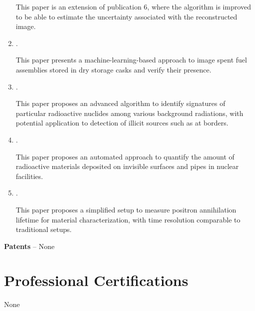 \documentclass[letterpaper,11pt]{article} %
\begin{document}
\begin{enumerate}
    This paper is an extension of publication 6, where the algorithm is improved to be able to estimate the uncertainty associated with the reconstructed image.
    \item {}. 
    
    This paper presents a machine-learning-based approach to image spent fuel assemblies stored in dry storage casks and verify their presence.
    \item {}. 
    
    This paper proposes an advanced algorithm to identify signatures of particular radioactive nuclides among various background radiations, with potential application to detection of illicit sources such as at borders.
    \item {}. 
    
    This paper proposes an automated approach to quantify the amount of radioactive materials deposited on invisible surfaces and pipes in nuclear facilities. 
    \item {}. 
    
    This paper proposes a simplified setup to measure positron annihilation lifetime for material characterization, with time resolution comparable to traditional setups.
\end{enumerate}
\hspace{1.5em}\textbf{Patents} -- None

\section{Professional Certifications}
None
\end{document}
